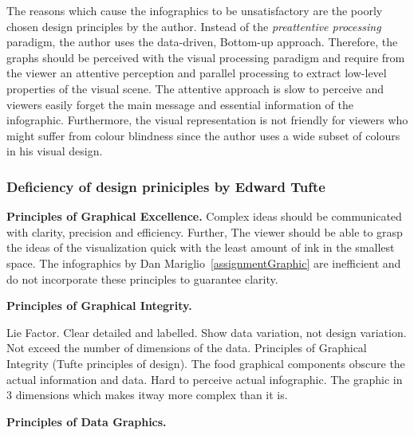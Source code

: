 The reasons which cause the infographics to be unsatisfactory are the poorly
chosen design principles by the author. Instead of the \textit{preattentive
processing} paradigm, the author uses the data-driven, Bottom-up approach.
Therefore, the graphs should be perceived with the visual processing paradigm
and require from the viewer an attentive perception and parallel processing to
extract low-level properties of the visual scene. The attentive approach is slow
to perceive and viewers easily forget the main message and essential information
of the infographic. Furthermore, the visual representation is not friendly for
viewers who might suffer from colour blindness since the author uses a wide
subset of colours in his visual design.

\subsubsection{Deficiency of design priniciples by Edward Tufte}

\textbf{Principles of Graphical Excellence.} Complex ideas should be
communicated with clarity, precision and efficiency. Further, The viewer should
be able to grasp the ideas of the visualization quick with the least amount of
ink in the smallest space. The infographics by Dan
Mariglio~\ref{assignmentGraphic} are inefficient and do not incorporate these
principles to guarantee clarity.

\textbf{Principles of Graphical Integrity.}

Lie Factor. Clear detailed and labelled. Show data variation, not design
variation. Not exceed the number of dimensions of the data. Principles of
Graphical Integrity (Tufte principles of design). The food graphical components
obscure the actual information and data. Hard to perceive actual infographic.
The graphic in 3 dimensions which makes itway more complex than it is.

\textbf{Principles of Data Graphics.}


